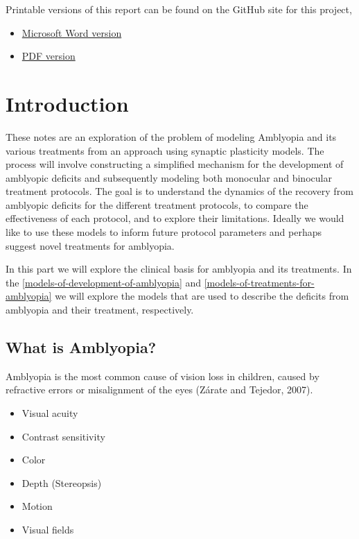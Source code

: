 \documentclass[
  onecolumn]{article}
\providecommand{\tightlist}{%
  \setlength{\itemsep}{0pt}\setlength{\parskip}{0pt}}
\begin{document}
Printable versions of this report can be found on the GitHub site for
this project,

\begin{itemize}
\tightlist
\item
  \href{https://github.com/bblais/Amblyopia-Simulation/raw/main/Manuscript/docs/Comparing-Treatments-for-Amblyopia-with-a-Synaptic-Plasticity-Model.docx}{Microsoft
  Word version}
\item
  \href{https://github.com/bblais/Amblyopia-Simulation/raw/main/Manuscript/docs/Comparing-Treatments-for-Amblyopia-with-a-Synaptic-Plasticity-Model.pdf}{PDF
  version}
\end{itemize}

\hypertarget{introduction}{%
\section{Introduction}\label{introduction}}

These notes are an exploration of the problem of modeling Amblyopia and
its various treatments from an approach using synaptic plasticity
models. The process will involve constructing a simplified mechanism for
the development of amblyopic deficits and subsequently modeling both
monocular and binocular treatment protocols. The goal is to understand
the dynamics of the recovery from amblyopic deficits for the different
treatment protocols, to compare the effectiveness of each protocol, and
to explore their limitations. Ideally we would like to use these models
to inform future protocol parameters and perhaps suggest novel
treatments for amblyopia.

In this part we will explore the clinical basis for amblyopia and its
treatments. In the \ref{models-of-development-of-amblyopia} and
\ref{models-of-treatments-for-amblyopia} we will explore the models that
are used to describe the deficits from amblyopia and their treatment,
respectively.

\hypertarget{what-is-amblyopia}{%
\subsection{What is Amblyopia?}\label{what-is-amblyopia}}

Amblyopia is the most common cause of vision loss in children, caused by
refractive errors or misalignment of the eyes (Zárate and Tejedor,
2007).

\begin{itemize}
\tightlist
\item
  Visual acuity
\item
  Contrast sensitivity
\item
  Color
\item
  Depth (Stereopsis)
\item
  Motion
\item
  Visual fields
\end{itemize}
\end{document}
